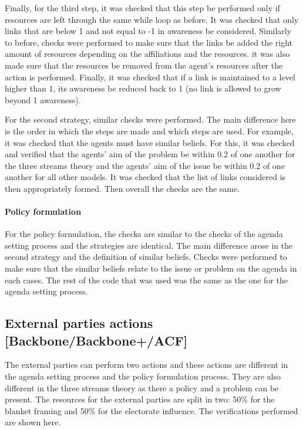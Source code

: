 Finally, for the third step, it was checked that this step be performed only if resources are left through the same while loop as before. It was checked that only links that are below 1 and not equal to -1 in awareness be considered. Similarly to before, checks were performed to make sure that the links be added the right amount of resources depending on the affiliations and the resources. it was also made sure that the resources be removed from the agent’s resources after the action is performed. Finally, it was checked that if a link is maintained to a level higher than 1, its awareness be reduced back to 1 (no link is allowed to grow beyond 1 awareness).

For the second strategy, similar checks were performed. The main difference here is the order in which the steps are made and which steps are used. For example, it was checked that the agents must have similar beliefs. For this, it was checked and verified that the agents’ aim of the problem be within 0.2 of one another for the three streams theory and the agents’ aim of the issue be within 0.2 of one another for all other models. It was checked that the list of links considered is then appropriately formed. Then overall the checks are the same.

%
\paragraph{Policy formulation}

For the policy formulation, the checks are similar to the checks of the agenda setting process and the strategies are identical. The main difference arose in the second strategy and the definition of similar beliefs. Checks were performed to make sure that the similar beliefs relate to the issue or problem on the agenda in each cases. The rest of the code that was used was the same as the one for the agenda setting process.

\subsection{External parties actions [Backbone/Backbone+/ACF]}

The external parties can perform two actions and these actions are different in the agenda setting process and the policy formulation process. They are also different in the three streams theory as there a policy and a problem can be present. The resources for the external parties are split in two: 50\% for the blanket framing and 50\% for the electorate influence. The verifications performed are shown here.

